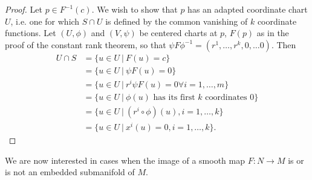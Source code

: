 \begin{proof}
Let $p \in F^{-1}(c)$. We wish to show that $p$ has an adapted
coordinate chart $U$, i.e. one for which $S \cap U$ is defined by the
common vanishing of $k$ coordinate functions. Let $(U, \phi)$ and
$(V, \psi)$ be centered charts at $p$, $F(p)$ as in the proof of the
constant rank theorem, so that
$\psi F \phi^{-1} = (r^1, \dots, r^k, 0, \dots 0)$. Then
\begin{align*}
   U \cap S
&= \{ u \in U ~\vert~ F(u) = c \} \\
&= \{ u \in U ~\vert~ \psi F(u) = 0 \} \\
&= \{ u \in U ~\vert~ r^i \psi F(u) = 0 \forall i = 1, \dots, m \} \\
&= \{ u \in U ~\vert~ \phi(u) \text{ has its first $k$ coordinates 0}
   \} \\
&= \{ u \in U ~\vert~ (r^i \circ \phi)(u), i=1, \dots, k \} \\
&= \{ u \in U ~\vert~ x^i(u) = 0, i=1, \dots, k \}.
\end{align*}
\end{proof}

We are now interested in cases when the image of a smooth map $F: N
\to M$ is or is not an embedded submanifold of $M$.

